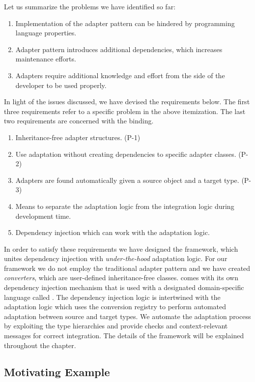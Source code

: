 Let us summarize the problems we have identified so far:
\begin{enumerate}[{P}-1]
\item Implementation of the adapter pattern can be hindered by programming language properties.
\item Adapter pattern introduces additional dependencies, which increases maintenance efforts.
\item Adapters require additional knowledge and effort from the side of the developer to be used properly.
\end{enumerate}

In light of the issues discussed, we have devised the requirements below. The first three requirements refer to a specific problem in the above itemization. The last two requirements are concerned with the binding.

\begin{enumerate}[{R}-1]
\item Inheritance-free adapter structures. (P-1)  
\item Use adaptation without creating dependencies to specific adapter classes. (P-2)
\item Adapters are found automatically given a source object and a target type. (P-3)
\item Means to separate the adaptation logic from the integration logic during development time.
\item Dependency injection which can work with the adaptation logic.
\end{enumerate}

In order to satisfy these requirements we have designed the \zamk framework, which unites dependency injection with \emph{under-the-hood} adaptation logic.
For our framework we do not employ the traditional adapter pattern and we have created \emph{converters}, which are user-defined inheritance-free classes. 
\zamk comes with its own dependency injection mechanism that is used with a designated domain-specific language called \gluer. 
The dependency injection logic is intertwined with the adaptation logic which uses the conversion registry to perform automated adaptation between source and target types. 
We automate the adaptation process by exploiting the type hierarchies and provide checks and context-relevant messages for correct integration. The details of the framework will be explained throughout the chapter.

\subsection{Motivating Example}
\label{sec:adapter:motiv}

